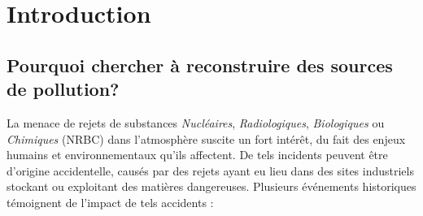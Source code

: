 


\chapter{Introduction}

\section{Pourquoi chercher à reconstruire des sources de pollution?}
	La menace de rejets de substances \textit{Nucléaires}, \textit{Radiologiques}, \textit{{Biologiques}} ou \textit{Chimiques} (NRBC) dans l'atmosphère suscite un fort intérêt, du fait des enjeux humains et environnementaux qu'ils affectent. De tels incidents peuvent être d'origine accidentelle, causés par des rejets ayant eu lieu dans des sites industriels stockant ou exploitant des matières dangereuses. Plusieurs événements historiques témoignent de l'impact de tels accidents :\\
